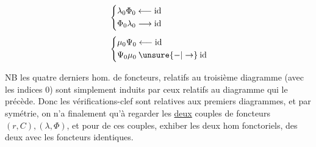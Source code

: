 \noindent\begin{minipage}{.62\linewidth}\small
{}
\end{minipage}\hfill\begin{minipage}{.36\linewidth}\small
\[
 \begin{aligned}
 &\left\{\begin{aligned}\lambda_0\Phi_0&\longleftarrow\mathrm{id}\\\Phi_0\lambda_0&\longrightarrow\mathrm{id}\end{aligned}\right.\\[3pt]
 &\left\{\begin{aligned}\mu_0\Psi_0&\longleftarrow\mathrm{id}\\\Psi_0\mu_0&\mathbin{\unsure{-|\to}}\mathrm{id}\end{aligned}\right.
 \end{aligned}
\]
\end{minipage}\par


NB les quatre derniers hom. de foncteurs, relatifs au troisième diagramme (avec les indices 0) sont simplement induits par ceux relatifs au diagramme qui le précède. Donc les vérifications-clef sont relatives aux  premiers diagrammes, et par symétrie, on n'a finalement qu'à regarder les \uline{deux} couples de foncteurs $(r,C),(\lambda,\Phi)$, et pour  de ces couples, exhiber les deux hom fonctoriels, des deux  avec les foncteurs identiques.

